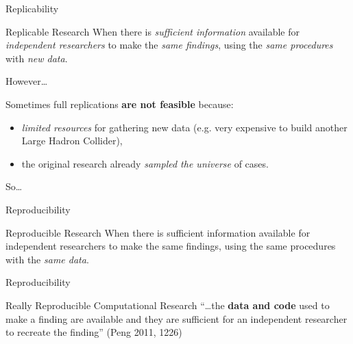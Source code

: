 \documentclass[10pt]{beamer}
\begin{document}
\begin{frame}{Replicability}

    \begin{exampleblock}{Replicable Research}
        When there is \emph{sufficient information} available for \emph{independent researchers} to make the \emph{same findings}, using the \emph{same procedures} with \emph{new data}.
    \end{exampleblock}

\end{frame}

\begin{frame}{However\ldots}

    Sometimes full replications \textbf{are not feasible} because:

    \begin{itemize}
        \item \emph{limited resources} for gathering new data (e.g. very expensive to build another Large Hadron Collider),

        \vspace{0.5cm}

        \item the original research already \emph{sampled the universe} of cases.
    \end{itemize}

    \vspace{0.5cm}

    {\large{So\ldots}}

\end{frame}

\begin{frame}{Reproducibility}

    \begin{exampleblock}{Reproducible Research}
        When there is sufficient information available for independent researchers to make the same findings, using the same procedures with the \emph{same data}.
    \end{exampleblock}

\end{frame}

\begin{frame}{Reproducibility}

    \begin{exampleblock}{Really Reproducible Computational Research}
        ``\ldots the \textbf{data and code} used to make a finding are available and they are sufficient for an independent researcher to recreate the finding'' (Peng 2011, 1226)
    \end{exampleblock}

\end{frame}
\end{document}
